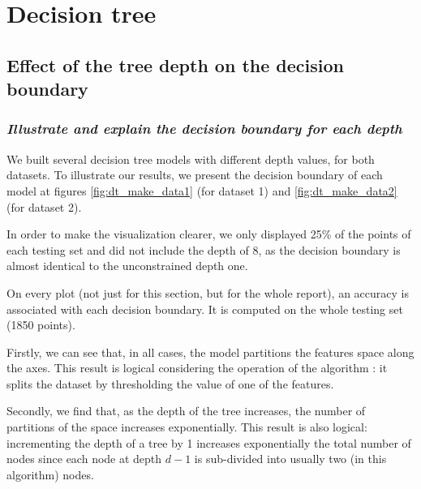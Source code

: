 \section{Decision tree}

\subsection{Effect of the tree depth on the decision boundary}

\subsubsection{{\it Illustrate and explain the decision boundary for each depth}}
We built several decision tree models with different depth values, for both datasets. To illustrate our results, we present the decision boundary of each model at figures \ref{fig:dt_make_data1} (for dataset 1) and \ref{fig:dt_make_data2} (for dataset 2).\par
In order to make the visualization clearer, we only displayed \num{25}\% of the points of each testing set and did not include the depth of 8, as the decision boundary is almost identical to the unconstrained depth one.\par
On every plot (not just for this section, but for the whole report), an accuracy is associated with each decision boundary. It is computed on the whole testing set (\num{1850} points).\par
Firstly, we can see that, in all cases, the model partitions the features space along the axes. This result is logical considering the operation of the algorithm : it splits the dataset by thresholding the value of one of the features.\par
Secondly, we find that, as the depth of the tree increases, the number of partitions of the space increases exponentially. This result is also logical: incrementing the depth of a tree by 1 increases exponentially the total number of nodes since each node at depth $d-1$ is sub-divided into usually two (in this algorithm) nodes.
